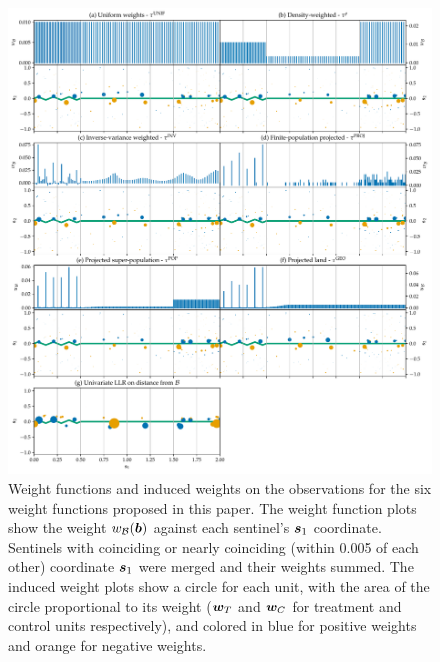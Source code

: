 \begin{figure}[ptb]
\centering
\includegraphics[width=\textwidth]{figures/weight_functions.pdf}
\caption{
    \label{fig:weight_functions}
    Weight functions and induced weights on the observations for the six weight functions proposed in this paper. The weight function plots show the weight \(w_{\mathcal{B}}(\bm{b})\) against each sentinel's \(\bm{s}_1\) coordinate. Sentinels with coinciding or nearly coinciding (within 0.005 of each other) coordinate \(\bm{s}_1\) were merged and their weights summed. The induced weight plots show a circle for each unit, with the area of the circle proportional to its weight (\(\bm{w}_{T}\) and \(\bm{w}_{C}\) for treatment and control units respectively), and colored in blue for positive weights and orange for negative weights.}
\end{figure}

